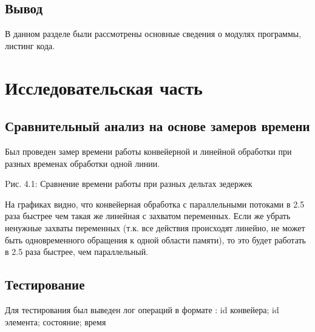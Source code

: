 \documentclass[12pt]{report}
\begin{document}
\section{Вывод}
В данном разделе были рассмотрены основные сведения о модулях программы, листинг кода.


\chapter{Исследовательская часть}

\section{Сравнительный анализ на основе замеров времени}

Был проведен замер времени работы конвейерной и линейной обработки при разных временах обработки одной линии.
 
\begin{center}
Pис. 4.1: Сравнение времени работы при разных дельтах зедержек
\end{center}


На графиках видно, что конвейерная обработка с параллельными потоками в 2.5 раза быстрее чем такая же линейная с захватом переменных.
Если же убрать ненужные захваты переменных (т.к. все действия происходят линейно, не может быть одновременного обращения к одной области памяти), то это будет работать в 2.5 раза быстрее, чем параллельный.

\section{Тестирование}
Для тестирования был выведен лог операций в формате : 
id конвейера; id элемента; состояние; время
\end{document}
